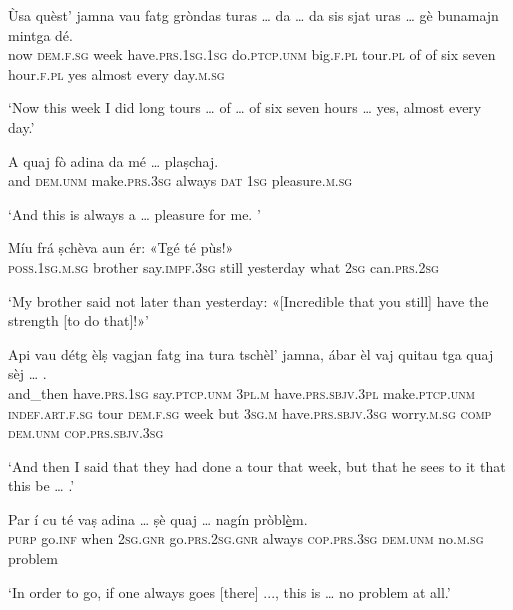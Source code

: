 \begin{linenumbers}
\gll Ùsa quèst’ jamna vau fatg gròndas turas … da … da sis sjat uras … gè bunamajn mintga dé.  \\
now \textsc{dem.f.sg} week  have.\textsc{prs.1sg.1sg} do.\textsc{ptcp.unm} big.\textsc{f.pl} tour.\textsc{pl} {} of {} of six seven hour.\textsc{f.pl} {} yes almost every day.\textsc{m.sg}  \\
\end{linenumbers}
\medskip
\glt `Now this week I did long tours … of … of six seven hours … yes, almost every day.'
\medskip

\begin{linenumbers}
\gll  A quaj fò adina da mé … plaṣchaj.  \\
and \textsc{dem.unm} make.\textsc{prs.3sg} always \textsc{dat} \textsc{1sg} {} pleasure.\textsc{m.sg} \\
\end{linenumbers}
\medskip
\glt `And this is always a … pleasure for me. '
\medskip

\begin{linenumbers}
\gll Míu frá ṣchèva aun ér: «Tgé té pùs!»   \\
\textsc{poss.1sg.m.sg} brother say.\textsc{impf.3sg} still yesterday what \textsc{2sg} can.\textsc{prs.2sg} \\
\end{linenumbers}
\medskip
\glt `My brother said not later than yesterday: «[Incredible that you still] have the strength [to do that]!»'
\medskip

\begin{linenumbers}
\gll Api vau détg èlṣ vagjan fatg ina tura tschèl’ jamna, ábar èl vaj quitau tga quaj sèj … .\\  
and\_then have.\textsc{prs.1sg} say.\textsc{ptcp.unm} \textsc{3pl.m} have.\textsc{prs.sbjv.3pl} make.\textsc{ptcp.unm} \textsc{indef.art.f.sg} tour  \textsc{dem.f.sg} week but \textsc{3sg.m} have.\textsc{prs.sbjv.3sg} worry.\textsc{m.sg} \textsc{comp} \textsc{dem.unm} \textsc{cop.prs.sbjv.3sg} \\
\end{linenumbers}
\medskip
\glt `And then I said that they had done a tour that week, but that he sees to it that this be … .'
\medskip

\begin{linenumbers}
\gll  Par í cu té vaṣ adina … ṣè quaj … nagín pròbl\underline{è}m.  \\
\textsc{purp} go.\textsc{inf} when \textsc{2sg.gnr} go.\textsc{prs.2sg.gnr} always {} \textsc{cop.prs.3sg} \textsc{dem.unm} {} no.\textsc{m.sg} problem \\
\end{linenumbers}
\medskip
\glt `In order to go, if one always goes [there] ..., this is … no problem at all.'
\medskip

